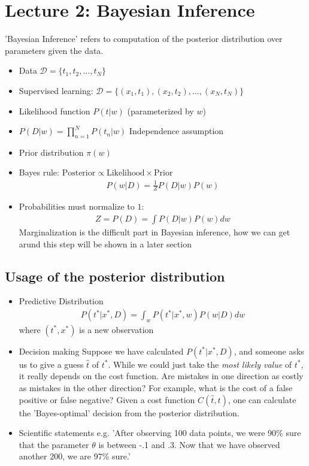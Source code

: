 \section[Bayesian Inference]{Lecture 2: Bayesian Inference}

'Bayesian Inference' refers to computation of the posterior distribution over parameters given the data.

\begin{itemize}
\item Data $\mathcal{D}=\{t_1, t_2, \ldots, t_N\}$
\item Supervised learning: $\mathcal{D}=\{(x_1,t_1), (x_2,t_2), \ldots, (x_N,t_N)\}$
\item Likelihood function $P(t|w)$ \hspace{1cm}(parameterized by $w$)
\item $P(D|w)= \prod_{n=1}^N P(t_n|w)$ Independence assumption
\item Prior distribution $\pi(w)$
\item Bayes rule: $\mbox{Posterior} \propto \mbox{Likelihood}  \times \mbox{Prior}$
\begin{align}
P(w | D) =\frac{1}{Z} P(D|w) P(w)
\end{align}
\item Probabilities must normalize to $1$: 
\begin{align}
Z= P(D)= \int P(D|w) P(w) dw
\end{align}
Marginalization is the difficult part in Bayesian inference, how we can get arund this step will be shown in a later section
\end{itemize}

\subsection{Usage of the posterior distribution}

	\begin{itemize}
		\item Predictive Distribution
		\begin{align}
			P(t^*|x^*, D)= \int_w P(t^*| x^*, w) P(w| D)   dw
		\end{align}
		where $(t^*,x^*)$ is a new observation

		\item Decision making
		Suppose we have calculated $P(t^*|x^*, D)$, and someone asks us to give a guess $\hat t$ of $t^*$. While we could just take the \emph{most likely value} of $t^*$, it really depends on the cost function. Are mistakes in one direction as costly as mistakes in the other direction? For example, what is the cost of a false positive or false negative? Given a {cost function} $C(\hat t, t)$, one can calculate the 'Bayes-optimal' decision from the posterior distribution. 
		\item Scientific statements
		e.g. 'After observing 100 data points, we were 90\% sure that the parameter $\theta$ is between -.1 and .3. Now that we have observed another 200, we are 97\% sure.'
	\end{itemize}
	

